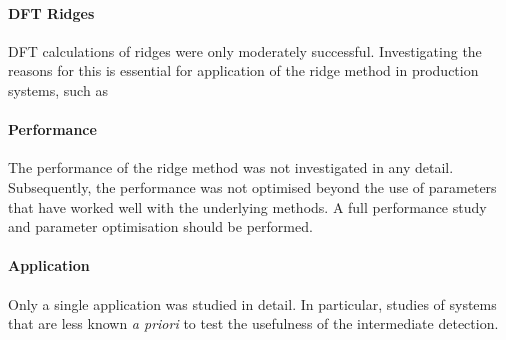 \paragraph{DFT Ridges}
DFT calculations of ridges were only moderately successful.
Investigating the reasons for this is essential for application of the ridge method in production systems, such as \expand


\paragraph{Performance}
The performance of the ridge method was not investigated in any detail.
Subsequently, the performance was not optimised beyond the use of parameters that have worked well with the underlying methods.
A full performance study and parameter optimisation should be performed.

\paragraph{Application}
Only a single application was studied in detail.
In particular, studies of systems that are less known \textit{a priori} to test the usefulness of the intermediate  detection.
